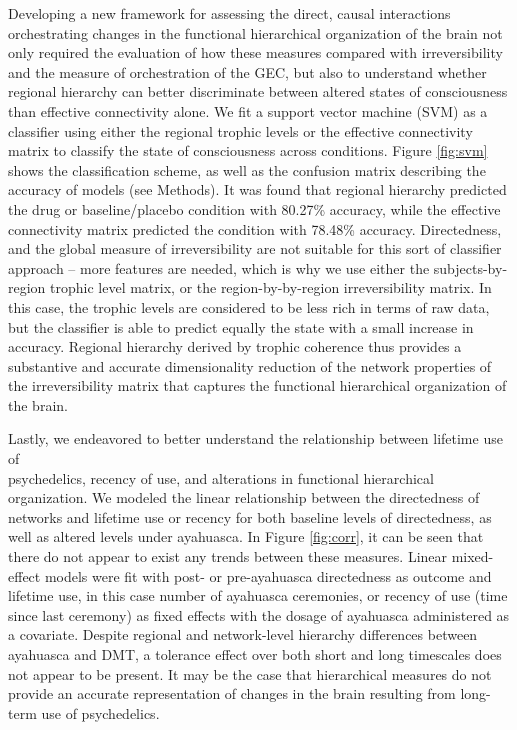 Developing a new framework for assessing the direct, causal interactions
orchestrating changes in the functional hierarchical organization of the
brain not only required the evaluation of how these measures compared
with irreversibility and the measure of orchestration of the GEC, but
also to understand whether regional hierarchy can better discriminate
between altered states of consciousness than effective connectivity
alone. We fit a support vector machine (SVM) as a classifier using
either the regional trophic levels or the effective connectivity matrix to
classify the state of consciousness across conditions. Figure \ref{fig:svm} shows
the classification scheme, as well as the confusion matrix
describing the accuracy of models (see Methods). It was found that regional hierarchy
predicted the drug or baseline/placebo condition with 80.27\% accuracy,
while the effective connectivity matrix predicted the condition with 78.48\% accuracy. Directedness, and the global measure of irreversibility are not suitable for this sort of classifier approach -- more features are needed, which is why we use either the subjects-by-region trophic level matrix, or the region-by-by-region irreversibility matrix. In this case, the trophic levels are considered to be less rich in terms of raw data, but the classifier is able to predict equally the state with a small increase in accuracy. Regional hierarchy derived by trophic coherence thus provides a
substantive and accurate dimensionality reduction of the network properties of the irreversibility matrix that captures the functional hierarchical
organization of the brain.

Lastly, we endeavored to better understand the relationship between lifetime use of\\ psychedelics, recency of use, and alterations in functional hierarchical organization. We modeled the linear relationship
between the directedness of networks and lifetime use or recency for
both baseline levels of directedness, as well as altered levels under
ayahuasca. In Figure \ref{fig:corr}, it can be seen that there do not appear to exist
any trends between these measures. Linear mixed-effect models were fit
with post- or pre-ayahuasca directedness as outcome and lifetime use, in
this case number of ayahuasca ceremonies, or recency of use (time since
last ceremony) as fixed effects with the dosage of ayahuasca
administered as a covariate. Despite regional and network-level hierarchy differences between ayahuasca and DMT, a tolerance effect over both short and long timescales does not appear to be present. It may be the case that hierarchical measures do not provide an accurate representation of changes in the brain resulting from long-term use of psychedelics. 
